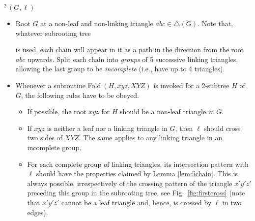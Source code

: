 \documentclass[reqno,12pt]{amsart}
\newcommand{\shift}{\mbox{}\hspace{4.5mm}}
\newcommand{\fold}[2]{{\sc Fold}$^{#1}\,(#2)$}
\newcommand{\edit}[1]{}
\begin{document}
\shift\fold2{G,\ell}\\[-6.5mm]
\begin{itemize}
\item
Root $G$ at a non-leaf and non-linking triangle $abc\in\triangle(G)$.
Note that, whatever subrooting tree 
\edit{recall the notion?}
is used, each chain will appear in it
as a path in the direction from the root $abc$ upwards.
Split each chain into \emph{groups} of 5 successive linking triangles,
allowing the last group to be \emph{incomplete} (i.e., have up to 4 triangles).
\item
Whenever a subroutine \fold{}{H,xyz,XYZ} is invoked for a 2-subtree $H$ of $G$,
the following rules have to be obeyed.
\begin{itemize}
\item
If possible, the root $xyz$ for $H$ should be a non-leaf triangle in $G$.
\item
If $xyz$ is neither a leaf nor a linking triangle in $G$,
then $\ell$ should cross two sides of $XYZ$. The same applies to any linking
triangle in an incomplete group.
\item
For each complete group of linking triangles, its intersection pattern
with $\ell$ should have the properties claimed by Lemma \ref{lem:5chain}.
This is always possible, irrespectively of the crossing pattern of the
triangle $x'y'z'$ preceding this group in the subrooting tree, see Fig.~\ref{fig:firstcross}
(note that $x'y'z'$ cannot be a leaf triangle and, hence, is crossed by $\ell$
in two edges).
\end{itemize}
\end{itemize}

\smallskip
\end{document}
